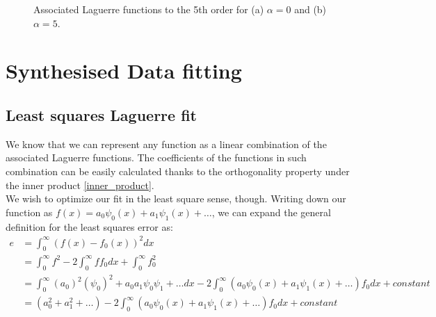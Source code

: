 \documentclass[a4paper]{article}
\numberwithin{equation}{section}
\begin{document}
\begin{figure}[!ht]
  \centering
  \quad
  \caption{Associated Laguerre functions to the 5th order for (a) $\alpha=0$ and (b) $\alpha=5$.}
  \label{fig:associatedlaguerre}
\end{figure}

\section{Synthesised Data fitting}

\subsection{Least squares Laguerre fit}
We know that we can represent any function as a linear combination of the associated Laguerre functions. The coefficients of the functions in such combination can be easily calculated thanks to the orthogonality property under the inner product \ref{inner_product}.\\
We wish to optimize our fit in the least square sense, though. Writing down our function as $f(x)=a_0\psi_0(x)+a_1\psi_1(x)+\ldots$, we can expand the general definition for the least squares error as:
\begin{align}
e &= \int_{0}^{\infty} (f(x)-f_0(x))^2dx \\
  &= \int_{0}^{\infty} f^2 - 2 \int_{0}^{\infty} f f_0 dx + \int_{0}^{\infty} f_0^2 \\
  &= \int_{0}^{\infty} (a_0)^2(\psi_0)^2 + a_0a_1\psi_0\psi_1 + \ldots dx - 2 \int_{0}^{\infty} (a_0\psi_0(x)+a_1\psi_1(x)+\ldots)f_0 dx + constant \\
  &= (a_0^2+a_1^2+\ldots) - 2 \int_{0}^{\infty} (a_0\psi_0(x)+a_1\psi_1(x)+\ldots)f_0 dx + constant
\end{align}
\end{document}
